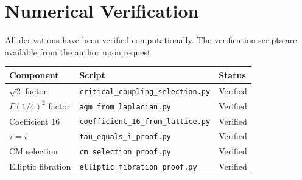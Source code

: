 \documentclass[11pt,a4paper]{article}
\theoremstyle{definition}
\theoremstyle{remark}
\begin{document}
\section{Numerical Verification}
\label{app:numerical}

All derivations have been verified computationally. The verification scripts are available from the author upon request.

\begin{center}
\begin{tabular}{lll}
\toprule
Component & Script & Status \\
\midrule
$\sqrt{2}$ factor & \texttt{critical\_coupling\_selection.py} & Verified \\
$\Gamma(1/4)^2$ factor & \texttt{agm\_from\_laplacian.py} & Verified \\
Coefficient 16 & \texttt{coefficient\_16\_from\_lattice.py} & Verified \\
$\tau = i$ & \texttt{tau\_equals\_i\_proof.py} & Verified \\
CM selection & \texttt{cm\_selection\_proof.py} & Verified \\
Elliptic fibration & \texttt{elliptic\_fibration\_proof.py} & Verified \\
\bottomrule
\end{tabular}
\end{center}

\end{document}
